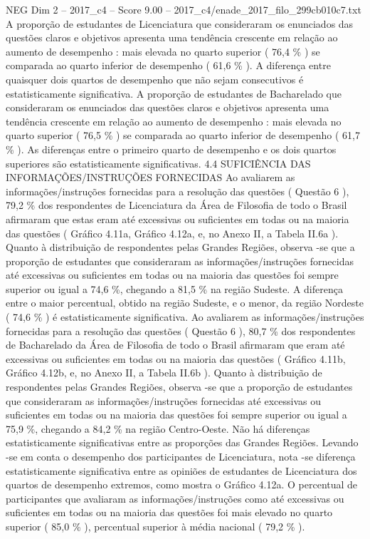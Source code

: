 \begin{textsample}{NEG Dim 2 – 2017\_c4 – Score 9.00 – 2017\_c4/enade\_2017\_filo\_299cb010c7.txt}
A proporção de estudantes de Licenciatura que consideraram os enunciados das questões claros e objetivos apresenta uma tendência crescente em relação ao aumento de desempenho : mais elevada no quarto superior ( 76,4 \% ) se comparada ao quarto inferior de desempenho ( 61,6 \% ).
A diferença entre quaisquer dois quartos de desempenho que não sejam consecutivos é estatisticamente significativa.
A proporção de estudantes de Bacharelado que consideraram os enunciados das questões claros e objetivos apresenta uma tendência crescente em relação ao aumento de desempenho : mais elevada no quarto superior ( 76,5 \% ) se comparada ao quarto inferior de desempenho ( 61,7 \% ).
As diferenças entre o primeiro quarto de desempenho e os dois quartos superiores são estatisticamente significativas. 4.4 SUFICIÊNCIA DAS INFORMAÇÕES/INSTRUÇÕES FORNECIDAS Ao avaliarem as informações/instruções fornecidas para a resolução das questões ( Questão 6 ), 79,2 \% dos respondentes de Licenciatura da Área de Filosofia de todo o Brasil afirmaram que estas eram até excessivas ou suficientes em todas ou na maioria das questões ( Gráfico 4.11a, Gráfico 4.12a, e, no Anexo II, a Tabela II.6a ).
Quanto à distribuição de respondentes pelas Grandes Regiões, observa -se que a proporção de estudantes que consideraram as informações/instruções fornecidas até excessivas ou suficientes em todas ou na maioria das questões foi sempre superior ou igual a 74,6 \%, chegando a 81,5 \% na região Sudeste.
A diferença entre o maior percentual, obtido na região Sudeste, e o menor, da região Nordeste ( 74,6 \% ) é estatisticamente significativa.
Ao avaliarem as informações/instruções fornecidas para a resolução das questões ( Questão 6 ), 80,7 \% dos respondentes de Bacharelado da Área de Filosofia de todo o Brasil afirmaram que eram até excessivas ou suficientes em todas ou na maioria das questões ( Gráfico 4.11b, Gráfico 4.12b, e, no Anexo II, a Tabela II.6b ).
Quanto à distribuição de respondentes pelas Grandes Regiões, observa -se que a proporção de estudantes que consideraram as informações/instruções fornecidas até excessivas ou suficientes em todas ou na maioria das questões foi sempre superior ou igual a 75,9 \%, chegando a 84,2 \% na região Centro-Oeste.
Não há diferenças estatisticamente significativas entre as proporções das Grandes Regiões.
Levando -se em conta o desempenho dos participantes de Licenciatura, nota -se diferença estatisticamente significativa entre as opiniões de estudantes de Licenciatura dos quartos de desempenho extremos, como mostra o Gráfico 4.12a.
O percentual de participantes que avaliaram as informações/instruções como até excessivas ou suficientes em todas ou na maioria das questões foi mais elevado no quarto superior ( 85,0 \% ), percentual superior à média nacional ( 79,2 \% ).

\end{textsample}
